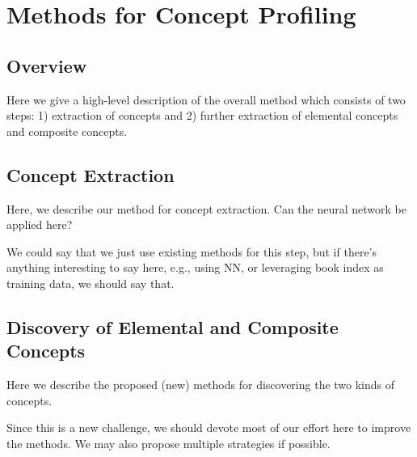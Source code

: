 \section{Methods for Concept Profiling}
\subsection{Overview}

Here we give a high-level description of the overall method which consists of two steps: 1) extraction of concepts and 2) further extraction of elemental concepts and composite concepts.

\subsection{Concept Extraction}

Here, we describe our method for concept extraction. Can the neural network be applied here? 

We could say that we just use existing methods for this step, but if there's anything interesting to say here, e.g., using NN, or leveraging book index as training data, we should say that. 

\subsection{Discovery of Elemental and Composite Concepts}

Here we describe the proposed (new) methods for discovering the two kinds of concepts. 

Since this is a new challenge, we should devote most of our effort here to improve the methods. We may also propose multiple strategies if possible. 
